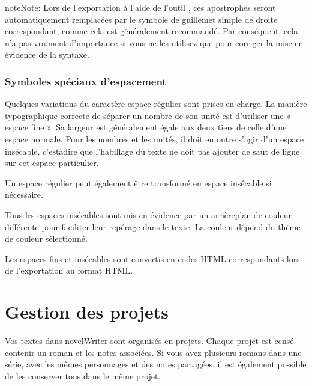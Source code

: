 \documentclass[a4paper,11pt,french]{sphinxmanual}
\begin{document}
\begin{sphinxadmonition}{note}{Note:}
\sphinxAtStartPar
Lors de l’exportation à l’aide de l’outil , ces apostrophes seront automatiquement remplacées par le symbole de guillemet simple de droite correspondant, comme cela est généralement recommandé. Par conséquent, cela n’a pas vraiment d’importance si vous ne les utilisez que pour corriger la mise en évidence de la syntaxe.
\end{sphinxadmonition}


\subsection{Symboles spéciaux d’espacement}
\label{\detokenize{usage_typography:special-space-symbols}}
\sphinxAtStartPar
Quelques variations du caractère espace régulier sont prises en charge. La manière typographique correcte de séparer un nombre de son unité est d’utiliser une « espace fine ». Sa largeur est généralement égale aux deux tiers de celle d’une espace normale. Pour les nombres et les unités, il doit en outre s’agir d’un espace insécable, c’est\sphinxhyphen{}à\sphinxhyphen{}dire que l’habillage du texte ne doit pas ajouter de saut de ligne sur cet espace particulier.

\sphinxAtStartPar
Un espace régulier peut également être transformé en espace insécable si nécessaire.

\sphinxAtStartPar
Tous les espaces insécables sont mis en évidence par un arrière\sphinxhyphen{}plan de couleur différente pour faciliter leur repérage dans le texte. La couleur dépend du thème de couleur sélectionné.

\sphinxAtStartPar
Les espaces fins et insécables sont convertis en codes HTML correspondants lors de l’exportation au format HTML.

\sphinxstepscope


\chapter{Gestion des projets}
\label{\detokenize{project_overview:managing-projects}}\label{\detokenize{project_overview:a-proj}}\label{\detokenize{project_overview::doc}}
\sphinxAtStartPar
Vos textes dans novelWriter sont organisés en projets. Chaque projet est censé contenir un roman et les notes associées. Si vous avez plusieurs romans dans une série, avec les mêmes personnages et des notes partagées, il est également possible de les conserver tous dans le même projet.
\end{document}
